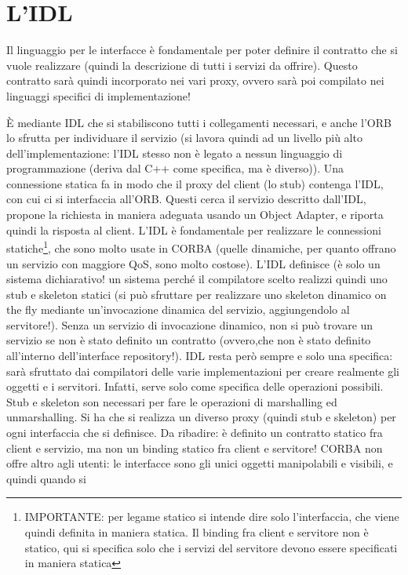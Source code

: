 \section{L'IDL}
Il linguaggio per le interfacce è fondamentale per poter definire il contratto che si vuole realizzare (quindi la
descrizione di tutti i servizi da offrire). Questo contratto sarà quindi incorporato nei vari proxy, ovvero sarà poi
compilato nei linguaggi specifici di implementazione!

È mediante IDL che si stabiliscono tutti i collegamenti necessari, e anche l'ORB lo sfrutta per individuare il servizio
(si lavora quindi ad un livello più alto dell'implementazione: l'IDL stesso non è legato a nessun linguaggio di
programmazione (deriva dal C++ come specifica, ma è diverso)). Una connessione statica fa in modo che il proxy del
client (lo stub) contenga l'IDL, con cui ci si interfaccia all'ORB. Questi cerca il servizio descritto dall'IDL, propone
la richiesta in maniera adeguata usando un Object Adapter, e riporta quindi la risposta al client.
L'IDL è fondamentale per realizzare le connessioni statiche\footnote{IMPORTANTE: per legame statico si intende dire solo
l'interfaccia, che viene quindi definita in maniera statica. Il binding fra client e servitore non è statico, qui si
specifica solo che i servizi del servitore devono essere specificati in maniera statica}, che sono molto usate in CORBA
(quelle dinamiche, per quanto offrano un servizio con maggiore QoS, sono molto costose). L'IDL definisce (è solo un
sistema dichiarativo! un sistema perché il compilatore scelto realizzi quindi uno stub e skeleton statici (si può
sfruttare per realizzare uno skeleton dinamico on the fly mediante un'invocazione dinamica del servizio, aggiungendolo
al servitore!). Senza un servizio di invocazione dinamico, non si può trovare un servizio se non è stato definito un
contratto (ovvero,che non è stato definito all'interno dell'interface repository!).
IDL resta però sempre e solo una specifica: sarà sfruttato dai compilatori delle varie implementazioni per creare
realmente gli oggetti e i servitori. Infatti, serve solo come specifica delle operazioni possibili.
Stub e skeleton son necessari per fare le operazioni di marshalling ed unmarshalling. Si ha che si realizza un diverso
proxy (quindi stub e skeleton) per ogni interfaccia che si definisce.
Da ribadire: è definito un contratto statico fra client e servizio, ma non un binding statico fra client e servitore!
CORBA non offre altro agli utenti: le interfacce sono gli unici oggetti manipolabili e visibili, e quindi quando si
